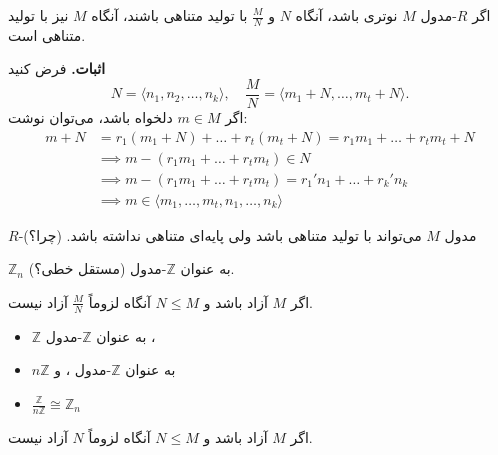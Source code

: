 \begin{frame}
    \begin{theorem}
        اگر $R$-مدول $M$ نوتری باشد، آنگاه $N$ و $\frac{M}{N}$ با تولید متناهی باشند، آنگاه $M$ نیز با تولید متناهی است.
    \end{theorem}


    \textbf{اثبات.} فرض کنید
    \[
        N = \langle n_1, n_2, \dots, n_k \rangle, \quad
        \frac{M}{N} = \langle m_1 + N, \dots, m_t + N \rangle.
    \]
    اگر $m \in M$ دلخواه باشد، می‌توان نوشت:
    \[
        \begin{aligned}
            m + N & = r_1 (m_1 + N) + \dots + r_t (m_t + N) = r_1 m_1 + \dots + r_t m_t + N \\
                  & \implies m - (r_1 m_1 + \dots + r_t m_t) \in N                          \\
                  & \implies m - (r_1 m_1 + \dots + r_t m_t) = r_1' n_1 + \dots + r_k' n_k  \\
                  & \implies m \in \langle m_1, \dots, m_t, n_1, \dots, n_k \rangle
        \end{aligned}
    \]


\end{frame}


\begin{frame}
    \begin{remark}
        $R$-مدول $M$ می‌تواند با تولید متناهی باشد ولی   پایه‌ای متناهی نداشته باشد. (چرا؟)
    \end{remark}

    \begin{example}
        $\mathbb{Z}_n$ به عنوان $\mathbb{Z}$-مدول (مستقل خطی؟).

    \end{example}


    \begin{remark}
        اگر $M$ آزاد باشد و $N \leqslant M$ آنگاه لزوماً $\frac{M}{N}$ آزاد نیست.

    \end{remark}


\end{frame}

\begin{frame}
    \begin{example}
        \begin{itemize}
            \item $\mathbb{Z}$ به عنوان $\mathbb{Z}$-مدول ،
            \item $n\mathbb{Z}$ به عنوان $\mathbb{Z}$-مدول ، و
            \item \(\frac{\mathbb{Z}}{n\mathbb{Z}} \cong \mathbb{Z}_n\)
        \end{itemize}

    \end{example}

    \begin{remark}
        اگر $M$ آزاد باشد و $N \leqslant M$ آنگاه لزوماً $N$ آزاد نیست.

    \end{remark}
\end{frame}

